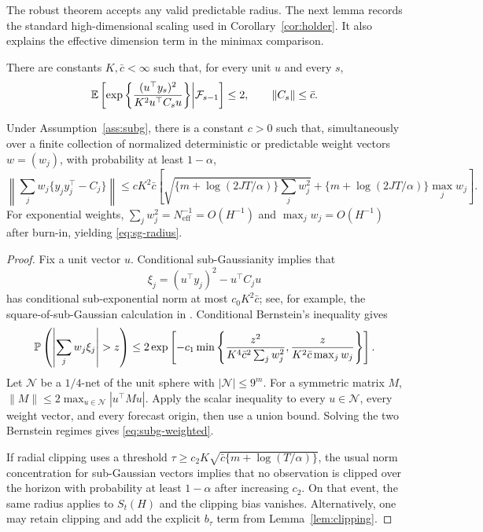 The robust theorem accepts any valid predictable radius.  The next lemma records the standard high-dimensional scaling used in Corollary~\ref{cor:holder}.  It also explains the effective dimension term in the minimax comparison.

\begin{assumption}
\label{ass:subg}
There are constants $K,\bar c<\infty$ such that, for every unit $u$ and every $s$,
\begin{equation}
 \mathbb{E}\left[\exp\left\{\frac{(u^\top y_s)^2}{K^2u^\top C_su}\right\}\middle|\mathcal{F}_{s-1}\right]\le2,
 \qquad \|C_s\|\le\bar c.
\end{equation}
\end{assumption}

\begin{lemma}
\label{lem:subg-radius}
Under Assumption~\ref{ass:subg}, there is a constant $c>0$ such that, simultaneously over a finite collection of normalized deterministic or predictable weight vectors $w=(w_j)$, with probability at least $1-\alpha$,
\begin{equation}
 \left\|\sum_jw_j\{y_jy_j^\top-C_j\}\right\|
 \le cK^2\bar c\left[
 \sqrt{\{m+\log(2JT/\alpha)\}\sum_jw_j^2}
 +\{m+\log(2JT/\alpha)\}\max_jw_j
 \right].
 \label{eq:subg-weighted}
\end{equation}
For exponential weights, $\sum_jw_j^2=N_{\mathrm{eff}}^{-1}=O(H^{-1})$ and $\max_jw_j=O(H^{-1})$ after burn-in, yielding \eqref{eq:sg-radius}.
\end{lemma}

\begin{proof}
Fix a unit vector $u$.  Conditional sub-Gaussianity implies that
\begin{equation}
 \xi_j=(u^\top y_j)^2-u^\top C_ju
\end{equation}
has conditional sub-exponential norm at most $c_0K^2\bar c$; see, for example, the square-of-sub-Gaussian calculation in \citet{vershynin2018}.  Conditional Bernstein's inequality gives
\begin{equation}
 \Pp\left(\left|\sum_jw_j\xi_j\right|>z\right)
 \le2\exp\left[-c_1\min\left\{
 \frac{z^2}{K^4\bar c^2\sum_jw_j^2},
 \frac{z}{K^2\bar c\max_jw_j}
 \right\}\right].
\end{equation}
Let $\mathcal N$ be a $1/4$-net of the unit sphere with $|\mathcal N|\le9^m$.  For a symmetric matrix $M$,
$\|M\|\le2\max_{u\in\mathcal N}|u^\top Mu|$.  Apply the scalar inequality to every $u\in\mathcal N$, every weight vector, and every forecast origin, then use a union bound.  Solving the two Bernstein regimes gives \eqref{eq:subg-weighted}.

If radial clipping uses a threshold
$\tau\ge c_2K\sqrt{\bar c\{m+\log(T/\alpha)\}}$, the usual norm concentration for sub-Gaussian vectors implies that no observation is clipped over the horizon with probability at least $1-\alpha$ after increasing $c_2$.  On that event, the same radius applies to $S_t(H)$ and the clipping bias vanishes.  Alternatively, one may retain clipping and add the explicit $b_\tau$ term from Lemma~\ref{lem:clipping}.
\end{proof}

